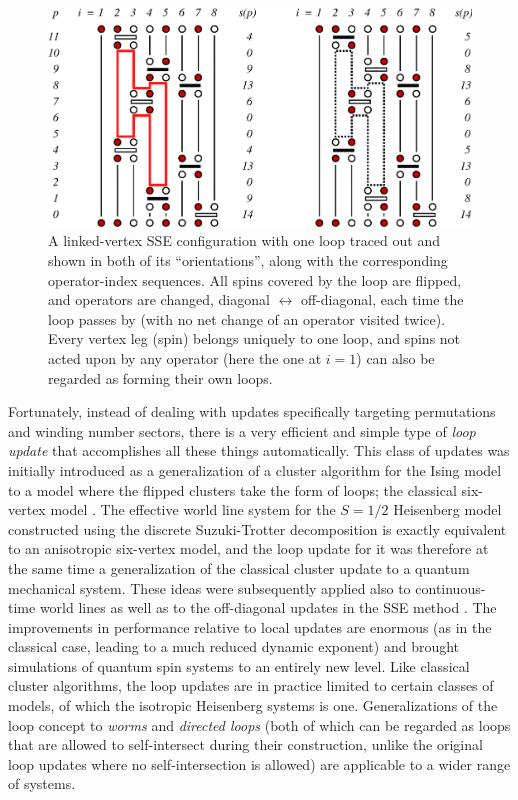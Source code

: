 \documentclass[draft,numberedheadings]{aipproc}
\begin{document}
\begin{figure}
\includegraphics[width=12.75cm]{sseloop.eps}
\caption{A linked-vertex SSE configuration with one loop traced out and shown in both of its ``orientations'', along with the corresponding 
operator-index sequences. All spins covered by the loop are flipped, and operators are changed, diagonal $\leftrightarrow$ off-diagonal, each 
time the loop passes by (with no net change of an operator visited twice). Every vertex leg (spin) belongs uniquely to one loop, and spins not 
acted upon by any operator (here the one at $i=1$) can also be regarded as forming their own loops.}
\label{sseloop}
\end{figure}

Fortunately, instead of dealing with updates specifically targeting permutations and winding number sectors, there is a very efficient and simple type of 
{\it loop update} that accomplishes all these things automatically. This class of updates was initially introduced as a generalization of a cluster 
algorithm for the Ising model to a model where the flipped clusters take the form of loops; the classical six-vertex model \cite{evertz93}. The effective 
world line system for the $S=1/2$ Heisenberg model constructed using the discrete Suzuki-Trotter decomposition is exactly equivalent to an anisotropic 
six-vertex model, and the loop update for it was therefore at the same time a generalization of the classical cluster update to a quantum mechanical system. 
These ideas were subsequently applied also to continuous-time world lines \cite{beard} as well as to the off-diagonal updates in the SSE method \cite{sandvik99a}. 
The improvements in performance relative to local updates are enormous (as in the classical case, leading to a much reduced dynamic exponent) and brought 
simulations of quantum spin systems to an entirely new level. Like classical cluster algorithms, the loop updates are in practice limited to certain classes 
of models, of which the isotropic Heisenberg systems is one. Generalizations of the loop concept to {\it worms} \cite{prokofev96} and {\it directed loops} 
\cite{syljuasen02} (both of which can be regarded as loops that are allowed to self-intersect during their construction, unlike the original loop updates
where no self-intersection is allowed) are applicable to a wider range of systems.
\end{document}
